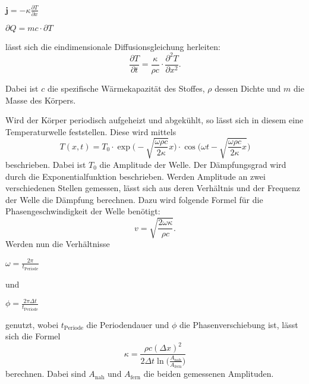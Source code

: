 \centerline{$\symbf{j} = - \kappa \frac{\partial T}{\partial x}$}

\centerline{$\partial Q = mc \cdot \partial T$}

lässt sich die eindimensionale Diffusionsgleichung herleiten:
\begin{equation}
\label{eqn:diffusion}
    \frac{\partial T}{\partial t} = \frac{\kappa}{\rho c} \cdot \frac{\partial^2 T}{\partial x^2}    .
\end{equation}

Dabei ist $c$ die spezifische Wärmekapazität des Stoffes, $\rho$ dessen Dichte und $m$ die Masse des Körpers.

Wird der Körper periodisch aufgeheizt und abgekühlt, so lässt sich in diesem eine Temperaturwelle feststellen.
Diese wird mittels
\begin{equation}
\label{eqn:term-welle}
    T(x, t) = T_0 \cdot \exp \bigg( -\sqrt{\frac{\omega \rho c}{2 \kappa}} x \bigg) \cdot \cos\bigg( \omega t - \sqrt{\frac{\omega \rho c}{2 \kappa} x} \bigg)
\end{equation}
beschrieben. Dabei ist $T_0$ die Amplitude der Welle. Der Dämpfungsgrad wird durch die Exponentialfunktion beschrieben.
Werden Amplitude an zwei verschiedenen Stellen gemessen, lässt sich aus deren Verhältnis und der Frequenz der Welle die Dämpfung berechnen.
Dazu wird folgende Formel für die Phasengeschwindigkeit der Welle benötigt:
\begin{equation}
\label{eqn:phasengeschwindigkeit}
    v = \sqrt{\frac{2 \omega \kappa}{\rho c}}  .
\end{equation}
Werden nun die Verhältnisse 

\centerline{$\omega = \frac{2 \pi}{t_\text{Periode}}$}

und

\centerline{$\phi = \frac{2 \pi \Delta t}{t_\text{Periode}}$}

genutzt, wobei $t_\text{Periode}$ die Periodendauer und $\phi$ die Phasenverschiebung ist, lässt sich die Formel
\begin{equation}
\label{eqn:leitfaehigkeit}
    \kappa = \frac{\rho c (\Delta x)^2}{2 \Delta t \ln \Big(\frac{A_\text{nah}}{A_\text{fern}}\Big)}
\end{equation}
berechnen. Dabei sind $A_\text{nah}$ und $A_\text{fern}$ die beiden gemessenen Amplituden.